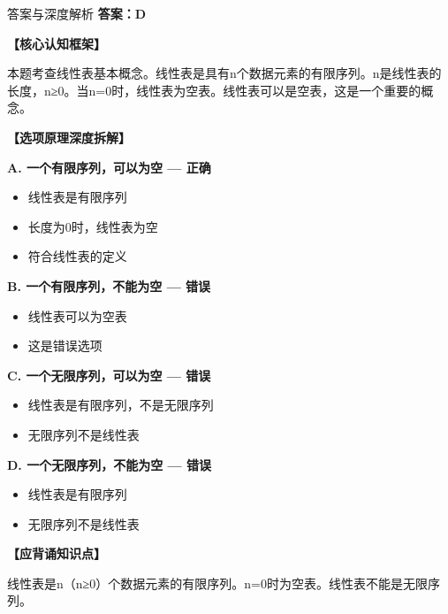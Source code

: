 \documentclass[12pt, a4paper]{article}
\newenvironment{bluebox}{\begin{framed}\begin{minipage}{\linewidth}}{\end{minipage}\end{framed}}
\begin{document}
\begin{bluebox}{答案与深度解析}
	\textbf{答案：D}

	\textbf{【核心认知框架】}

	本题考查线性表基本概念。线性表是具有n个数据元素的有限序列。n是线性表的长度，n≥0。当n=0时，线性表为空表。线性表可以是空表，这是一个重要的概念。

	\textbf{【选项原理深度拆解】}

	\item \textbf{A. 一个有限序列，可以为空 — 正确}
	\begin{itemize}
		\item 线性表是有限序列
		\item 长度为0时，线性表为空
		\item 符合线性表的定义
	\end{itemize}

	\item \textbf{B. 一个有限序列，不能为空 — 错误}
	\begin{itemize}
		\item 线性表可以为空表
		\item 这是错误选项
	\end{itemize}

	\item \textbf{C. 一个无限序列，可以为空 — 错误}
	\begin{itemize}
		\item 线性表是有限序列，不是无限序列
		\item 无限序列不是线性表
	\end{itemize}

	\item \textbf{D. 一个无限序列，不能为空 — 错误}
	\begin{itemize}
		\item 线性表是有限序列
		\item 无限序列不是线性表
	\end{itemize}

	\textbf{【应背诵知识点】}

	线性表是n（n≥0）个数据元素的有限序列。n=0时为空表。线性表不能是无限序列。
\end{bluebox}
\end{document}
